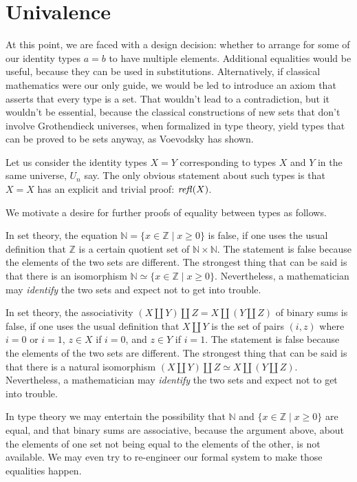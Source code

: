 \documentclass[letter,12pt]{amsart}
\theoremstyle{definition}
\theoremstyle{remark}
\numberwithin{equation}{section}
\newcommand{\refl}{\mathop{{\it refl}}}
\newcommand{\weq}{\simeq}
\newcommand{\ZZ}{\mathbb{Z}}
\newcommand{\NN}{\mathbb{N}}
\begin{document}
\section{Univalence}

At this point, we are faced with a design decision: whether to arrange for some of our identity types $a=b$ to have multiple elements.
Additional equalities would be useful, because they can be used in substitutions.  Alternatively, if classical mathematics were our only guide,
we would be led to introduce an axiom that asserts that every type is a set.  That wouldn't lead to a contradiction, but it wouldn't be
essential, because the classical constructions of new sets that don't involve Grothendieck universes, when formalized in type theory, yield
types that can be proved to be sets anyway, as Voevodsky has shown.

Let us consider the identity types $X=Y$ corresponding to types $X$ and $Y$ in the same universe, $U_n$ say.  The only obvious statement about
such types is that $X=X$ has an explicit and trivial proof: $\refl(X)$.

We motivate a desire for further proofs of equality between types as follows.

In set theory, the equation $\NN = \{ x \in \ZZ \mid x \ge 0 \}$ is false, if one uses the usual definition that $\ZZ$ is a certain quotient set
of $\NN \times \NN$.  The statement is false because the elements of the two sets are different.  The strongest thing that can be said is that
there is an isomorphism $\NN \weq \{ x \in \ZZ \mid x \ge 0 \}$.  Nevertheless, a mathematician may {\em identify} the two sets and
expect not to get into trouble.

In set theory, the associativity $(X \amalg Y) \amalg Z = X \amalg (Y \amalg Z)$ of binary sums is false, if one uses the usual definition that
$X \amalg Y$ is the set of pairs $(i,z)$ where $i = 0$ or $i=1$, $z \in X$ if $i = 0$, and $z \in Y$ if $i = 1$.  The statement is false because
the elements of the two sets are different.  The strongest thing that can be said is that there is a natural isomorphism
$(X \amalg Y) \amalg Z \weq X \amalg (Y \amalg Z)$.
Nevertheless, a mathematician may {\em identify} the two sets and expect not to get into trouble.

In type theory we may entertain the possibility that $\NN$ and $\{ x \in \ZZ \mid x \ge 0 \}$ are equal, and that binary sums are associative,
because the argument above, about the elements of one set not being equal to the elements of the other, is not available.  We may even try to
re-engineer our formal system to make those equalities happen.
\end{document}
